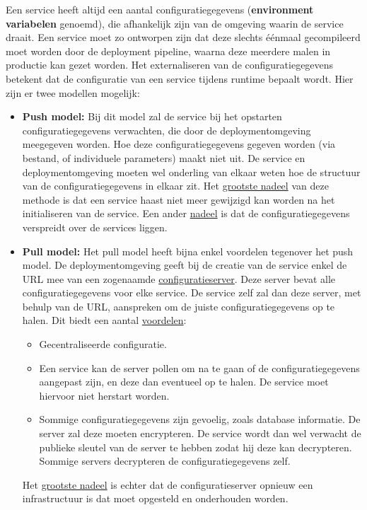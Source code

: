 	Een service heeft altijd een aantal configuratiegegevens (\textbf{environment variabelen} genoemd), die afhankelijk zijn van de omgeving waarin de service draait. Een service moet zo ontworpen zijn dat deze slechts éénmaal gecompileerd moet worden door de deployment pipeline, waarna deze meerdere malen in productie kan gezet worden. Het externaliseren van de configuratiegegevens betekent dat de configuratie van een service tijdens runtime bepaalt wordt. Hier zijn er twee modellen mogelijk:
	\begin{itemize}
		\item \textbf{Push model:} Bij dit model zal de service bij het opstarten configuratiegegevens verwachten, die door de deploymentomgeving meegegeven worden. Hoe deze configuratiegegevens gegeven worden (via bestand, of individuele parameters) maakt niet uit. De service en deploymentomgeving moeten wel onderling van elkaar weten hoe de structuur van de configuratiegegevens in elkaar zit. Het \underline{grootste nadeel} van deze methode is dat een service haast niet meer gewijzigd kan worden na het initialiseren van de service. Een ander \underline{nadeel} is dat de configuratiegegevens verspreidt over de services liggen.
		\item \textbf{Pull model:} Het pull model heeft bijna enkel voordelen tegenover het push model. De deploymentomgeving geeft bij de creatie van de service enkel de URL mee van een zogenaamde \underline{configuratieserver}. Deze server bevat alle configuratiegegevens voor elke service. De service zelf zal dan deze server, met behulp van de URL, aanspreken om de juiste configuratiegegevens op te halen. Dit biedt een aantal \underline{voordelen}:
		\begin{itemize}
			\item Gecentraliseerde configuratie.
			\item Een service kan de server pollen om na te gaan of de configuratiegegevens aangepast zijn, en deze dan eventueel op te halen. De service moet hiervoor niet herstart worden.
			\item Sommige configuratiegegevens zijn gevoelig, zoals database informatie. De server zal deze moeten encrypteren. De service wordt dan wel verwacht de publieke sleutel van de server te hebben zodat hij deze kan decrypteren. Sommige servers decrypteren de configuratiegegevens zelf.
		\end{itemize}
		Het \underline{grootste nadeel} is echter dat de configuratieserver opnieuw een infrastructuur is dat moet opgesteld en onderhouden worden.
	\end{itemize}


